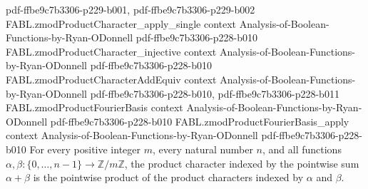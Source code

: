 \begin{theorem}
  {pdf-ffbe9c7b3306-p229-b001,
    pdf-ffbe9c7b3306-p229-b002}
\proofstep
  {FABL.zmodProductCharacter_apply_single}
  {context}
  {Analysis-of-Boolean-Functions-by-Ryan-ODonnell}
  {pdf-ffbe9c7b3306-p228-b010}
\proofstep
  {FABL.zmodProductCharacter_injective}
  {context}
  {Analysis-of-Boolean-Functions-by-Ryan-ODonnell}
  {pdf-ffbe9c7b3306-p228-b010}
\proofstep
  {FABL.zmodProductCharacterAddEquiv}
  {context}
  {Analysis-of-Boolean-Functions-by-Ryan-ODonnell}
  {pdf-ffbe9c7b3306-p228-b010,
    pdf-ffbe9c7b3306-p228-b011}
\proofstep
  {FABL.zmodProductFourierBasis}
  {context}
  {Analysis-of-Boolean-Functions-by-Ryan-ODonnell}
  {pdf-ffbe9c7b3306-p228-b010}
\proofstep
  {FABL.zmodProductFourierBasis_apply}
  {context}
  {Analysis-of-Boolean-Functions-by-Ryan-ODonnell}
  {pdf-ffbe9c7b3306-p228-b010}
For every positive integer $m$, every natural number $n$, and all functions
$\alpha,\beta:\{0,\ldots,n-1\}\to\mathbb Z/m\mathbb Z$, the product character indexed by
the pointwise sum $\alpha+\beta$ is the pointwise product of the product characters
indexed by $\alpha$ and $\beta$.
\end{theorem}

